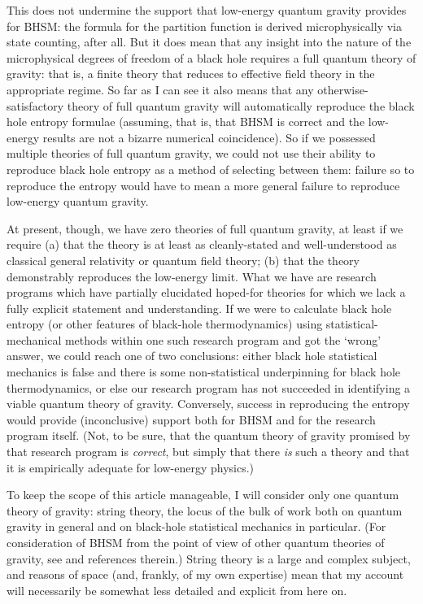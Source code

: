 \documentclass[12pt]{article}
\begin{document}
This does not undermine the support that low-energy quantum gravity provides for BHSM: the formula for the partition function is derived microphysically via state counting, after all. But it does mean that any insight into the nature of the microphysical degrees of freedom of a black hole requires a full quantum theory of gravity: that is, a finite theory that reduces to effective field theory in the appropriate regime. So far as I can see it also means that any otherwise-satisfactory theory of full quantum gravity will automatically reproduce the black hole entropy formulae (assuming, that is, that BHSM is correct and the low-energy results are not a bizarre numerical coincidence). So if we possessed multiple theories of full quantum gravity, we could not use their ability to reproduce black hole entropy as a method of selecting between them: failure so to reproduce the entropy would have to mean a more general failure to reproduce low-energy quantum gravity.

At present, though, we have zero theories of full quantum gravity, at least if we require (a) that the theory is at least as cleanly-stated and well-understood as classical general relativity or quantum field theory; (b) that the theory demonstrably reproduces the low-energy limit. What we have are research programs which have partially elucidated hoped-for theories for which we lack a fully explicit statement and understanding.  If we were to calculate black hole entropy (or other features of black-hole thermodynamics) using statistical-mechanical methods within one such research program and got the `wrong' answer, we could reach one of two conclusions: either black hole statistical mechanics is false and there is some non-statistical underpinning for black hole thermodynamics, or else our research program has not succeeded in identifying a viable quantum theory of gravity. Conversely, success in reproducing the entropy would provide (inconclusive) support both for BHSM and for the research program itself. (Not, to be sure, that the quantum theory of gravity promised by that research program is \emph{correct}, but simply that there \emph{is} such a theory and that it is empirically adequate for low-energy physics.)

To keep the scope of this article manageable, I will consider only one quantum theory of gravity: string theory, the locus of the bulk of work both on quantum gravity in general and on black-hole statistical mechanics in particular. (For consideration of BHSM from the point of view of other quantum theories of gravity, see  and references therein.) String theory is a large and complex subject, and reasons of space (and, frankly, of my own expertise) mean that my account will necessarily be somewhat less detailed and explicit from here on.
\end{document}
